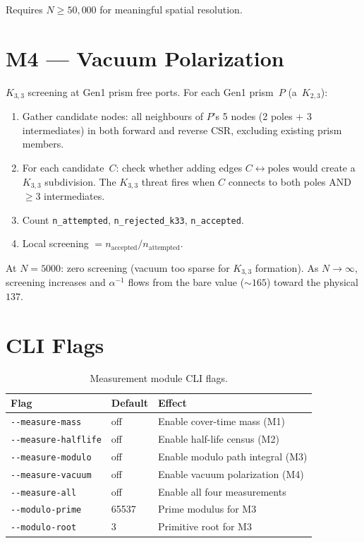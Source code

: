 \documentclass[11pt, a4paper, openany]{book}
\newcommand{\code}[1]{\texttt{#1}}
\begin{document}
Requires $N \geq 50{,}000$ for meaningful spatial resolution.

\section{M4 --- Vacuum Polarization}

$K_{3,3}$ screening at Gen1 prism free ports.  For each Gen1 prism~$P$
(a~$K_{2,3}$):
\begin{enumerate}
  \item Gather candidate nodes: all neighbours of $P$'s 5 nodes (2 poles +
        3 intermediates) in both forward and reverse CSR, excluding existing
        prism members.
  \item For each candidate~$C$: check whether adding edges $C \leftrightarrow
        \text{poles}$ would create a $K_{3,3}$ subdivision.  The $K_{3,3}$ threat
        fires when $C$ connects to both poles AND $\geq 3$ intermediates.
  \item Count \code{n\_attempted}, \code{n\_rejected\_k33},
        \code{n\_accepted}.
  \item Local screening $= n_{\text{accepted}} / n_{\text{attempted}}$.
\end{enumerate}

At $N = 5000$: zero screening (vacuum too sparse for $K_{3,3}$ formation).
As $N \to \infty$, screening increases and $\alpha^{-1}$ flows from the bare
value ($\sim 165$) toward the physical $137$.

\section{CLI Flags}

\begin{table}[H]
\centering
\begin{tabular}{@{} l l l @{}}
\toprule
\textbf{Flag} & \textbf{Default} & \textbf{Effect} \\
\midrule
\code{-{}-measure-mass}     & off   & Enable cover-time mass (M1) \\
\code{-{}-measure-halflife} & off   & Enable half-life census (M2) \\
\code{-{}-measure-modulo}   & off   & Enable modulo path integral (M3) \\
\code{-{}-measure-vacuum}   & off   & Enable vacuum polarization (M4) \\
\code{-{}-measure-all}      & off   & Enable all four measurements \\
\code{-{}-modulo-prime}     & 65537 & Prime modulus for M3 \\
\code{-{}-modulo-root}      & 3     & Primitive root for M3 \\
\bottomrule
\end{tabular}
\caption{Measurement module CLI flags.}
\end{table}
\end{document}
